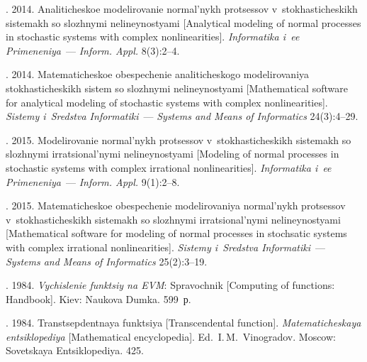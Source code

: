   \begin{multicols}{2}

\renewcommand{\bibname}{\protect\rmfamily References}



{\small\frenchspacing
 {%
 \begin{thebibliography}{99}

. 2014.
 Analiticheskoe modelirovanie normal'nykh protsessov v~sto\-kha\-sti\-che\-skikh sistemakh so slozhnymi nelineynostyami [Analytical modeling of normal
  processes in stochastic systems with complex nonlinearities].
  \textit{Informatika i~ee Primeneniya}~--- \textit{Inform. Appl.}  8(3):2--4.

. 2014.
Matematicheskoe obespechenie analiticheskogo modelirovaniya stokhasticheskikh sistem so slozhnymi nelineynostyami [Mathematical software for
analytical modeling of stochastic systems with complex nonlinearities].
\textit{Sistemy i~Sredstva Informatiki}~--- \textit{Systems and Means of
Informatics}  24(3):4--29.


.  2015.
Modelirovanie normal'nykh protsessov v~sto\-kha\-sti\-che\-skikh sistemakh so slozhnymi irratsional'nymi ne\-li\-ney\-no\-stya\-mi [Modeling of normal processes in stochastic systems with complex irrational nonlinearities].   \textit{Informatika i~ee Primeneniya}~--- \textit{Inform. Appl.} 9(1):2--8.

. 2015.
Ma\-te\-ma\-ti\-che\-skoe obespechenie modelirovaniya nor\-mal'\-nykh protsessov v~stokhasticheskikh sistemakh so slozhnymi irratsional'nymi nelineynostyami [Mathematical software for modeling of normal processes in stochsatic systems with complex irrational nonlinearities]. \textit{Sistemy i~Sredstva Informatiki}~--- \textit{Systems and Means of
Informatics} 25(2):3--19.


.  1984.
\textit{Vychislenie funktsiy na EVM}: Spravochnik [Computing of functions: Handbook]. Kiev: Naukova Dumka.  599~р.


. 1984.
Transtsepdentnaya funktsiya [Transcendental function].   \textit{Matematicheskaya entsiklopediya} [Mathematical encyclopedia].
Ed.\ I.\,M.~Vinogradov. Moscow: Sovetskaya Entsiklopediya. 425.



\end{thebibliography}}}
\end{multicols}
